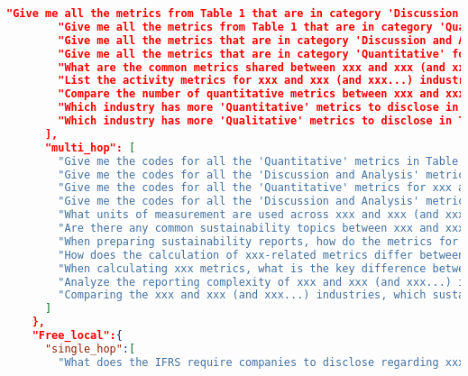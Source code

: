 \begin{appendices}
\begin{lstlisting}[language=json,firstnumber=1,label={lst:qa_structures},caption={User-representative sample questions for `CoT + Few-shot' question generation}]
        "Give me all the metrics from Table 1 that are in category 'Discussion and Analysis' for xxx and xxx (and xxx...) industries.",
        "Give me all the metrics from Table 1 that are in category 'Quantitative' for xxx and xxx (and xxx...) industries.",
        "Give me all the metrics that are in category 'Discussion and Analysis' for xxx and xxx (and xxx...) industries.",
        "Give me all the metrics that are in category 'Quantitative' for xxx and xxx (and xxx...) industries.",
        "What are the common metrics shared between xxx and xxx (and xxx...) industries, if any?",
        "List the activity metrics for xxx and xxx (and xxx...) industries.",
        "Compare the number of quantitative metrics between xxx and xxx (and xxx...) industries.",
        "Which industry has more 'Quantitative' metrics to disclose in Table 1 between xxx and xxx (and xxx) industries?",
        "Which industry has more 'Qualitative' metrics to disclose in Table 1 between xxx and xxx (and xxx) industries?"
      ],
      "multi_hop": [
        "Give me the codes for all the 'Quantitative' metrics in Table 1 for xxx and xxx (and xxx...) industries.",
        "Give me the codes for all the 'Discussion and Analysis' metrics in Table 1 for xxx and xxx (and xxx...) industries.",
        "Give me the codes for all the 'Quantitative' metrics for xxx and xxx (and xxx...) industries.",
        "Give me the codes for all the 'Discussion and Analysis' metrics for xxx and xxx (and xxx...) industries.",
        "What units of measurement are used across xxx and xxx (and xxx...) industries for measuring xxx?",
        "Are there any common sustainability topics between xxx and xxx (and xxx...) industries? If so, how do their reporting requirements differ?",
        "When preparing sustainability reports, how do the metrics for measuring xxx differ between the xxx and xxx (and xxx...) industries?",
        "How does the calculation of xxx-related metrics differ between xxx and xxx (and xxx...) companies?",
        "When calculating xxx metrics, what is the key difference between xxx and and xxx (and xxx...) companies?",
        "Analyze the reporting complexity of xxx and xxx (and xxx...) industries by comparing the number of required metrics and the diversity of measurement units used",
        "Comparing the xxx and xxx (and xxx...) industries, which sustainability topic is more prominently addressed in the xxx industry but not explicitly covered for xxx industry?"
      ]
    },
    "Free_local":{
      "single_hop":[
        "What does the IFRS require companies to disclose regarding xxx for the xxx industry?",

\end{lstlisting}
\end{appendices}
